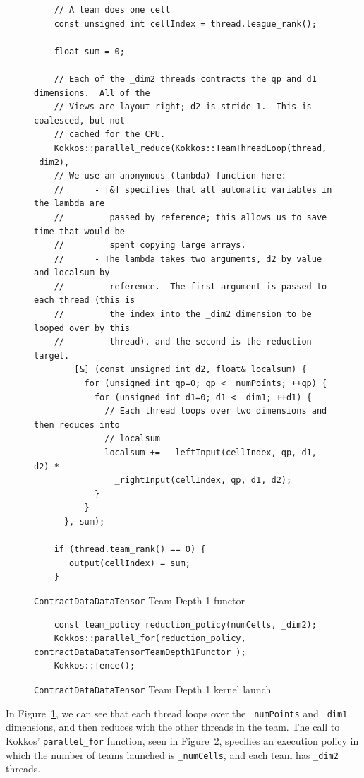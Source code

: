 \begin{figure}[ht]
    \begin{lstlisting}
    // A team does one cell
    const unsigned int cellIndex = thread.league_rank();

    float sum = 0;
    
    // Each of the _dim2 threads contracts the qp and d1 dimensions.  All of the
    // Views are layout right; d2 is stride 1.  This is coalesced, but not
    // cached for the CPU.
    Kokkos::parallel_reduce(Kokkos::TeamThreadLoop(thread, _dim2),
    // We use an anonymous (lambda) function here:
    //      - [&] specifies that all automatic variables in the lambda are
    //         passed by reference; this allows us to save time that would be
    //         spent copying large arrays.
    //      - The lambda takes two arguments, d2 by value and localsum by
    //         reference.  The first argument is passed to each thread (this is
    //         the index into the _dim2 dimension to be looped over by this
    //         thread), and the second is the reduction target.
        [&] (const unsigned int d2, float& localsum) {
          for (unsigned int qp=0; qp < _numPoints; ++qp) {
            for (unsigned int d1=0; d1 < _dim1; ++d1) {
              // Each thread loops over two dimensions and then reduces into
              // localsum
              localsum +=  _leftInput(cellIndex, qp, d1, d2) *
                _rightInput(cellIndex, qp, d1, d2);
            }
          }
      }, sum);

    if (thread.team_rank() == 0) {
      _output(cellIndex) = sum;
    }
 \end{lstlisting}
\caption{\texttt{ContractDataDataTensor} Team Depth 1 functor
\label{lst:ContractDataDataTensorDepth1Functor}} 
\end{figure}

\begin{figure}[ht]
    \begin{lstlisting}
    const team_policy reduction_policy(numCells, _dim2);
    Kokkos::parallel_for(reduction_policy, contractDataDataTensorTeamDepth1Functor );
    Kokkos::fence();
 \end{lstlisting}
\caption{\texttt{ContractDataDataTensor} Team Depth 1 kernel launch
\label{lst:ContractDataDataTensorDepth1Call}} 
\end{figure}

In Figure~\ref{lst:ContractDataDataTensorDepth1Functor}, we can see that each
thread loops over the \texttt{\_numPoints} and \texttt{\_dim1} dimensions, and then
reduces with the other threads in the team.  The call to Kokkos'
\texttt{parallel\_for} function, seen in
Figure~\ref{lst:ContractDataDataTensorDepth1Call}, specifies an execution policy
in which the number of teams launched is \texttt{\_numCells}, and each team has
\texttt{\_dim2} threads.

